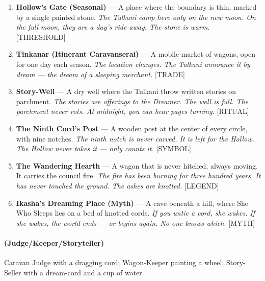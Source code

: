 \begin{enumerate}
\item \textbf{Hollow's Gate (Seasonal)} --- A place where the boundary is thin, marked by a single painted stone.
  \hfill \textit{The Tulkani camp here only on the new moon. On the full moon, they are a day's ride away. The stone is warm.} [THRESHOLD]
\item \textbf{Tinkanar (Itinerant Caravanserai)} --- A mobile market of wagons, open for one day each season.
  \hfill \textit{The location changes. The Tulkani announce it by dream --- the dream of a sleeping merchant.} [TRADE]
\item[J] \textbf{Story-Well} --- A dry well where the Tulkani throw written stories on parchment.
  \hfill \textit{The stories are offerings to the Dreamer. The well is full. The parchment never rots. At midnight, you can hear pages turning.} [RITUAL]
\item[Q] \textbf{The Ninth Cord's Post} --- A wooden post at the center of every circle, with nine notches.
  \hfill \textit{The ninth notch is never carved. It is left for the Hollow. The Hollow never takes it --- only counts it.} [SYMBOL]
\item[K] \textbf{The Wandering Hearth} --- A wagon that is never hitched, always moving. It carries the council fire.
  \hfill \textit{The fire has been burning for three hundred years. It has never touched the ground. The ashes are knotted.} [LEGEND]
\item[A] \textbf{Ikasha's Dreaming Place (Myth)} --- A cave beneath a hill, where She Who Sleeps lies on a bed of knotted cords.
  \hfill \textit{If you untie a cord, she wakes. If she wakes, the world ends --- or begins again. No one knows which.} [MYTH]
\end{enumerate}

\paragraph*{(Judge/Keeper/Storyteller)} Caravan Judge with a dragging cord; Wagon-Keeper painting a wheel; Story-Seller with a dream-cord and a cup of water.

